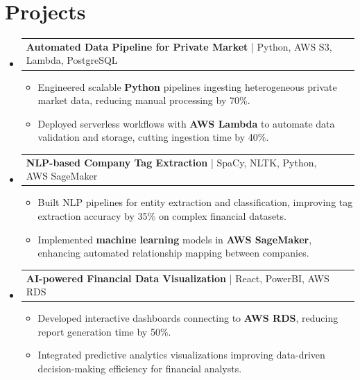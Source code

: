 \documentclass[letterpaper,11pt]{article}
\makeatletter
\newcommand{\resumeItem}[1]{
  \item\footnotesize{
    {#1 \vspace{-2pt}}
  }
}
\newcommand{\resumeProjectHeading}[2]{
    \item
    \begin{tabular*}{1.001\textwidth}{l@{\extracolsep{\fill}}r}
      \small#1 & \textbf{\small #2}\\
    \end{tabular*}\vspace{-7pt}
}
\newcommand{\resumeSubHeadingListStart}{\begin{itemize}[leftmargin=0pt, label={}]}
\newcommand{\resumeSubHeadingListEnd}{\end{itemize}}
\newcommand{\resumeItemListStart}{\begin{itemize}[leftmargin=*]}
\newcommand{\resumeItemListEnd}{\end{itemize}\vspace{-5pt}}
\makeatother
\begin{document}
\section{Projects}
    \vspace{-5pt}
    \resumeSubHeadingListStart
      \resumeProjectHeading
          {\textbf{Automated Data Pipeline for Private Market} | Python, AWS S3, Lambda, PostgreSQL}{}
          \resumeItemListStart
              \resumeItem{Engineered scalable \textbf{Python} pipelines ingesting heterogeneous private market data, reducing manual processing by 70\%.}
              \resumeItem{Deployed serverless workflows with \textbf{AWS Lambda} to automate data validation and storage, cutting ingestion time by 40\%.}
          \resumeItemListEnd
          \vspace{-12pt}
      \resumeProjectHeading
          {\textbf{NLP-based Company Tag Extraction} | SpaCy, NLTK, Python, AWS SageMaker}{}
          \resumeItemListStart
              \resumeItem{Built NLP pipelines for entity extraction and classification, improving tag extraction accuracy by 35\% on complex financial datasets.}
              \resumeItem{Implemented \textbf{machine learning} models in \textbf{AWS SageMaker}, enhancing automated relationship mapping between companies.}
          \resumeItemListEnd
          \vspace{-12pt}
      \resumeProjectHeading
          {\textbf{AI-powered Financial Data Visualization} | React, PowerBI, AWS RDS}{}
          \resumeItemListStart
              \resumeItem{Developed interactive dashboards connecting to \textbf{AWS RDS}, reducing report generation time by 50\%.}
              \resumeItem{Integrated predictive analytics visualizations improving data-driven decision-making efficiency for financial analysts.}
          \resumeItemListEnd 
    \resumeSubHeadingListEnd
\end{document}
